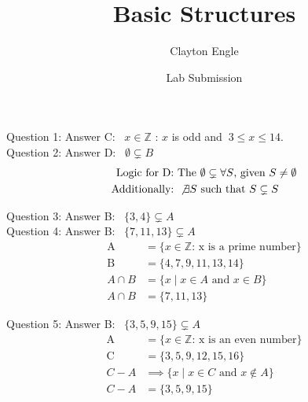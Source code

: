 \documentclass{article}
\title{Basic Structures }
\author{Clayton Engle}
\date{Lab Submission}
\begin{document}
\maketitle

Question 1:   Answer C: \ $x \in \mathbb{Z}$ : $x$ is odd and $\ 3 \le x  \le 14.$ \\
   
Question 2:   Answer D: \ $\emptyset \subsetneq B$
\begin{align}
    \text{Logic for D:\ } & \text{The\ } \emptyset \subsetneq  \forall S \text{, given\ } S\ne\emptyset \\
    \text{Additionally:\ }& \not\exists S \text{ such that } S \subsetneq S
\end{align}

Question 3:   Answer B: \ $\{3, 4 \} \subsetneq A$ \\

Question 4:   Answer B: \ $\{7, 11, 13 \} \subsetneq A$
\begin{align}
    \text{A\ } & = \{ x \in \mathbb{Z} \text{: x is a prime number} \}  \\
    \text{B\ } & = \{ 4, 7, 9, 11, 13, 14 \} \\
     A \cap B & = \{ x \mid x \in A \text{ and } x \in B \} \\
      A \cap B & = \{ 7, 11, 13 \} 
\end{align}

Question 5:   Answer B: \ $\{3, 5, 9, 15 \} \subsetneq A$
\begin{align}
    \text{A\ } & = \{ x \in \mathbb{Z} \text{: x is an even number} \}  \\
    \text{C\ } & = \{ 3, 5, 9, 12, 15, 16 \} \\
     C - A & \implies \{ x \mid x \in C \text{ and } x \notin A \} \\
      C - A & = \{ 3, 5, 9, 15 \} 
\end{align}
\end{document}
